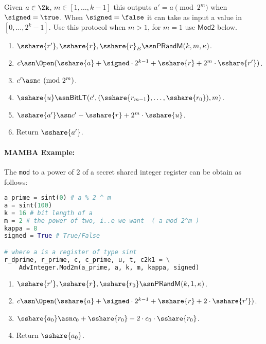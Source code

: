   Given $a \in \Zk$, $m \in [1,\ldots,k-1]$ this outputs $a' = a \pmod{2^m}$
  when $\signed=\true$.
  When $\signed=\false$ it can take as input a value in $[0,\ldots,2^k-1]$.
  Use this protocol when $m>1$, for $m=1$ use $\mathsf{Mod2}$ below.
  \begin{enumerate}
    \item $\sshare{r'}, \sshare{r}, \sshare{r}_B \asn \mathsf{PRandM}(k,m,\kappa)$.
    \item $c \asn \Open(\sshare{a}+\signed \cdot 2^{k-1}+\sshare{r}+2^m \cdot \sshare{r'})$.
    \item $c'\asn c \pmod{2^m}$.
    \item $\sshare{u} \asn \mathsf{BitLT}(c',(\sshare{r_{m-1}},\ldots,\sshare{r_0}),m)$.
    \item $\sshare{a'} \asn c'-\sshare{r}+2^m \cdot \sshare{u}$.
    \item Return $\sshare{a'}$.
  \end{enumerate}

  \paragraph{MAMBA Example:} The \verb|mod| to a power of $2$ of a secret shared integer register can be obtain as follows:
  \begin{lstlisting}[language={python}]
a_prime = sint(0) # a % 2 ^ m
a = sint(100)
k = 16 # bit length of a
m = 2 # the power of two, i..e we want  ( a mod 2^m )
kappa = 8
signed = True # True/False

# where a is a register of type sint
r_dprime, r_prime, c, c_prime, u, t, c2k1 = \
    AdvInteger.Mod2m(a_prime, a, k, m, kappa, signed)
\end{lstlisting}


  \begin{enumerate}
    \item $\sshare{r'}, \sshare{r}, \sshare{r_0} \asn \mathsf{PRandM}(k,1,\kappa)$.
    \item $c \asn \Open(\sshare{a}+\signed \cdot 2^{k-1}+\sshare{r}+2 \cdot \sshare{r'})$.
    \item $\sshare{a_0} \asn c_0+\sshare{r_0}-2 \cdot c_0 \cdot \sshare{r_0}$.
    \item Return $\sshare{a_0}$.
  \end{enumerate}

